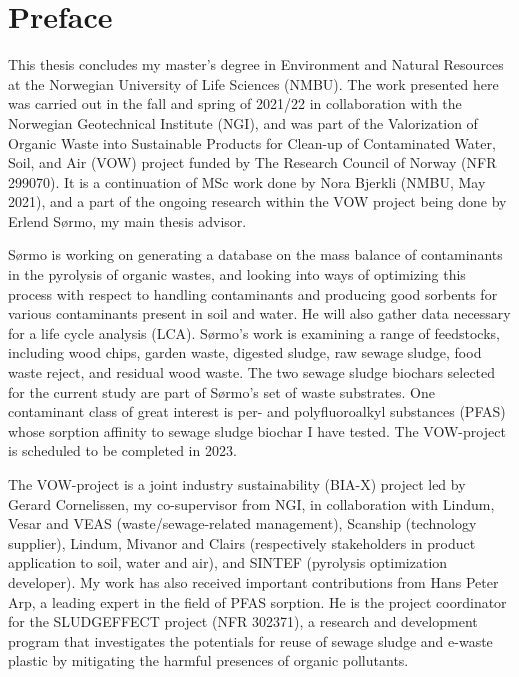 \newpage
{}
\section*{Preface}
This thesis concludes my master's degree in Environment and Natural Resources at the Norwegian University of Life Sciences (NMBU). The work presented here was carried out in the fall and spring of 2021/22 in collaboration with the Norwegian Geotechnical Institute (\acrshort{NGI}), and was part of the Valorization of Organic Waste into Sustainable Products for Clean-up of Contaminated Water, Soil, and Air (\acrshort{VOW}) project funded by The Research Council of Norway (NFR 299070). It is a continuation of MSc work done by Nora Bjerkli (NMBU, May 2021), and a part of the ongoing research within the VOW project being done by Erlend S\o rmo, my main thesis advisor. 

S\o rmo is working on generating a database on the mass balance of contaminants in the pyrolysis of organic wastes, and looking into ways of optimizing this process with respect to handling contaminants and producing good sorbents for various contaminants present in soil and water. He will also gather data necessary for a life cycle analysis (LCA). S\o rmo's work is examining a range of feedstocks, including wood chips, garden waste, digested sludge, raw sewage sludge, food waste reject, and residual wood waste. The two sewage sludge biochars selected for the current study are part of S\o rmo's set of waste substrates. One contaminant class of great interest is per- and polyfluoroalkyl substances (PFAS) whose sorption affinity to sewage sludge biochar I have tested. The VOW-project is scheduled to be completed in 2023.

The VOW-project is a joint industry sustainability (BIA-X) project led by Gerard Cornelissen, my co-supervisor from NGI, in collaboration with Lindum, Vesar and VEAS (waste/sewage-related management), Scanship (technology supplier), Lindum, Mivanor and Clairs (respectively stakeholders in product application to soil, water and air), and SINTEF (pyrolysis optimization developer). My work has also received important contributions from Hans Peter Arp, a leading expert in the field of PFAS sorption. He is the project coordinator for the SLUDGEFFECT project (NFR 302371), a research and development program that investigates the potentials for reuse of sewage sludge and e-waste plastic by mitigating the harmful presences of organic pollutants.   

